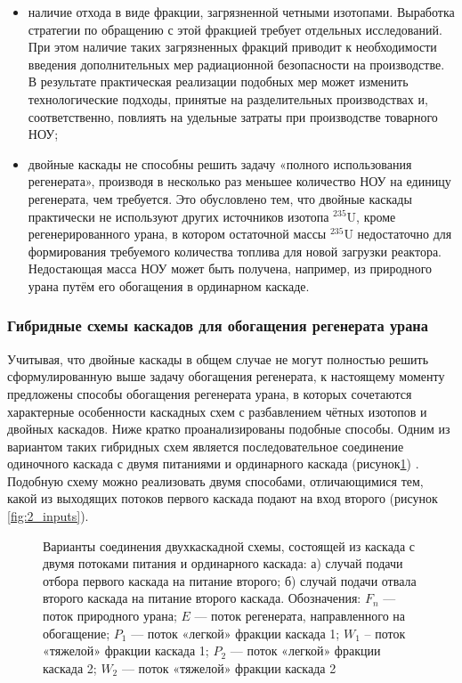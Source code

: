 \begin{itemize}
  \item наличие отхода в виде фракции, загрязненной четными изотопами. Выработка стратегии по обращению с этой фракцией требует отдельных исследований. При этом наличие таких загрязненных фракций приводит к необходимости введения дополнительных мер радиационной безопасности на производстве. В результате практическая реализации подобных мер может изменить технологические подходы, принятые на разделительных производствах и, соответственно, повлиять на удельные затраты при производстве товарного НОУ; 
  \item	двойные каскады не способны решить задачу «полного использования регенерата», производя в несколько раз меньшее количество НОУ на единицу регенерата, чем требуется. Это обусловлено тем, что двойные каскады практически не используют других источников изотопа $^{235}$U, кроме регенерированного урана, в котором остаточной массы $^{235}$U недостаточно для формирования требуемого количества топлива для новой загрузки реактора. Недостающая масса НОУ может быть получена, например, из природного урана путём его обогащения в ординарном каскаде.
\end{itemize}


\subsubsection{Гибридные схемы каскадов для обогащения регенерата урана}

Учитывая, что двойные каскады в общем случае не могут полностью решить сформулированную выше задачу обогащения регенерата, к настоящему моменту предложены способы обогащения регенерата урана, в которых сочетаются характерные особенности каскадных схем с разбавлением чётных изотопов и двойных каскадов. Ниже кратко проанализированы подобные способы.
Одним из вариантом таких гибридных схем является последовательное соединение одиночного каскада с двумя питаниями и ординарного каскада (рисунок\ref{f_2double}) \cite{palkinOchistkaRegenerirovannogoGeksaftorida2013}. Подобную схему можно реализовать двумя способами, отличающимися тем, какой из выходящих потоков первого каскада подают на вход второго (рисунок \ref{fig:2_inputs}).

\begin{figure}[ht]
  \caption{Варианты соединения двухкаскадной схемы, состоящей из каскада с двумя потоками питания и ординарного каскада: а) случай подачи отбора первого каскада на питание второго; б) случай подачи отвала второго каскада на питание второго каскада. Обозначения: $F_{n}$ --- поток природного урана; $E$ --- поток регенерата, направленного на обогащение; $P_1$ --- поток «легкой» фракции каскада 1; $W_1$ – поток «тяжелой» фракции каскада 1; $P_2$ --- поток «легкой» фракции каскада 2; $W_2$ --- поток «тяжелой» фракции каскада 2}\label{f_2double}
\end{figure}

